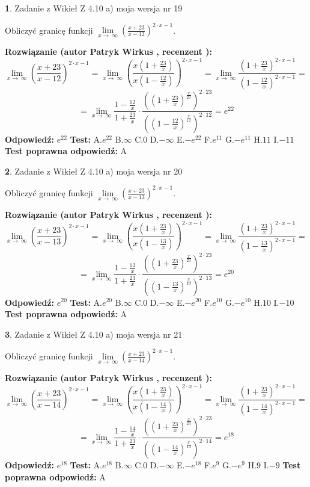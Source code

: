 \documentclass[12pt, a4paper]{article}
\theoremstyle{definition} %
\newtheorem{zad}{}
\newcommand{\zadStart}[1]{\begin{zad}#1\newline}
\newcommand{\zadStop}{\end{zad}}
\newcommand{\rozwStart}[2]{\noindent \textbf{Rozwiązanie (autor #1 , recenzent #2): }\newline}
\newcommand{\rozwStop}{\newline}
\newcommand{\odpStart}{\noindent \textbf{Odpowiedź:}\newline}
\newcommand{\odpStop}{\newline}
\newcommand{\testStart}{\noindent \textbf{Test:}\newline}
\newcommand{\testStop}{\newline}
\newcommand{\kluczStart}{\noindent \textbf{Test poprawna odpowiedź:}\newline}
\newcommand{\kluczStop}{\newline}
\begin{document}
\zadStart{Zadanie z Wikieł Z 4.10 a) moja wersja nr 19}

Obliczyć granicę funkcji  $\lim\limits_{x\to\ \infty}(\frac{x+23}{x-12})^{2\cdot x-1}$.
\zadStop
\rozwStart{Patryk Wirkus}{}
$$\lim\limits_{x\to\ \infty}(\frac{x+23}{x-12})^{2\cdot x-1} = \lim\limits_{x\to\ \infty}(\frac{x(1+\frac{23}{x})}{x(1-\frac{12}{x})})^{2\cdot x-1}=\lim\limits_{x\to\ \infty}\frac{(1+\frac{23}{x})^{2\cdot x-1}}{(1-\frac{12}{x})^{2\cdot x-1}}=$$
$$=\lim\limits_{x\to\ \infty}\frac{1-\frac{12}{x}}{1+\frac{23}{x}}\cdot\frac{((1+\frac{23}{x})^{\frac{x}{23}})^{2\cdot23}}{((1-\frac{12}{x})^{\frac{x}{12}})^{2\cdot12}}=e^{22}$$
\rozwStop
\odpStart
$e^{22}$
\odpStop
\testStart
A.$e^{22}$ B.$\infty$ C.$0$ D.$-\infty$ E.$-e^{22}$
F.$e^{11}$ G.$-e^{11}$
H.$11$
I.$-11$
\testStop
\kluczStart
A
\kluczStop



\zadStart{Zadanie z Wikieł Z 4.10 a) moja wersja nr 20}

Obliczyć granicę funkcji  $\lim\limits_{x\to\ \infty}(\frac{x+23}{x-13})^{2\cdot x-1}$.
\zadStop
\rozwStart{Patryk Wirkus}{}
$$\lim\limits_{x\to\ \infty}(\frac{x+23}{x-13})^{2\cdot x-1} = \lim\limits_{x\to\ \infty}(\frac{x(1+\frac{23}{x})}{x(1-\frac{13}{x})})^{2\cdot x-1}=\lim\limits_{x\to\ \infty}\frac{(1+\frac{23}{x})^{2\cdot x-1}}{(1-\frac{13}{x})^{2\cdot x-1}}=$$
$$=\lim\limits_{x\to\ \infty}\frac{1-\frac{13}{x}}{1+\frac{23}{x}}\cdot\frac{((1+\frac{23}{x})^{\frac{x}{23}})^{2\cdot23}}{((1-\frac{13}{x})^{\frac{x}{13}})^{2\cdot13}}=e^{20}$$
\rozwStop
\odpStart
$e^{20}$
\odpStop
\testStart
A.$e^{20}$ B.$\infty$ C.$0$ D.$-\infty$ E.$-e^{20}$
F.$e^{10}$ G.$-e^{10}$
H.$10$
I.$-10$
\testStop
\kluczStart
A
\kluczStop



\zadStart{Zadanie z Wikieł Z 4.10 a) moja wersja nr 21}

Obliczyć granicę funkcji  $\lim\limits_{x\to\ \infty}(\frac{x+23}{x-14})^{2\cdot x-1}$.
\zadStop
\rozwStart{Patryk Wirkus}{}
$$\lim\limits_{x\to\ \infty}(\frac{x+23}{x-14})^{2\cdot x-1} = \lim\limits_{x\to\ \infty}(\frac{x(1+\frac{23}{x})}{x(1-\frac{14}{x})})^{2\cdot x-1}=\lim\limits_{x\to\ \infty}\frac{(1+\frac{23}{x})^{2\cdot x-1}}{(1-\frac{14}{x})^{2\cdot x-1}}=$$
$$=\lim\limits_{x\to\ \infty}\frac{1-\frac{14}{x}}{1+\frac{23}{x}}\cdot\frac{((1+\frac{23}{x})^{\frac{x}{23}})^{2\cdot23}}{((1-\frac{14}{x})^{\frac{x}{14}})^{2\cdot14}}=e^{18}$$
\rozwStop
\odpStart
$e^{18}$
\odpStop
\testStart
A.$e^{18}$ B.$\infty$ C.$0$ D.$-\infty$ E.$-e^{18}$
F.$e^{9}$ G.$-e^{9}$
H.$9$
I.$-9$
\testStop
\kluczStart
A
\kluczStop
\end{document}
